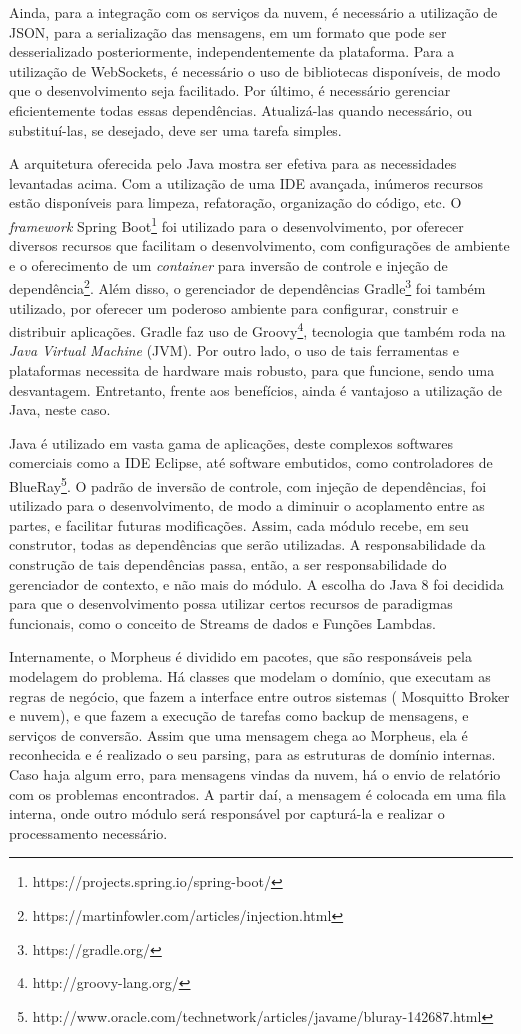 Ainda, para a integração com os serviços da nuvem, é necessário a utilização de JSON, para a serialização das mensagens, em um formato que pode ser desserializado posteriormente, independentemente da plataforma. Para a utilização de WebSockets, é necessário o uso de bibliotecas disponíveis, de modo que o desenvolvimento seja facilitado. Por último, é necessário gerenciar eficientemente todas essas dependências. Atualizá-las quando necessário, ou substituí-las, se desejado, deve ser uma tarefa simples.

A arquitetura oferecida pelo Java mostra ser efetiva para as necessidades levantadas acima. Com a utilização de uma IDE avançada, inúmeros recursos estão disponíveis para limpeza, refatoração, organização do código, etc. O \textit{framework} Spring Boot\footnote{https://projects.spring.io/spring-boot/} foi utilizado para o desenvolvimento, por oferecer diversos recursos que facilitam o desenvolvimento, com configurações de ambiente e o oferecimento de um \textit{container} para inversão de controle e injeção de dependência\footnote{https://martinfowler.com/articles/injection.html}. Além disso, o gerenciador de dependências Gradle\footnote{https://gradle.org/} foi também utilizado, por oferecer um poderoso ambiente para configurar, construir e distribuir aplicações. Gradle faz uso de Groovy\footnote{http://groovy-lang.org/}, tecnologia que também roda na \textit{Java Virtual Machine} (JVM). Por outro lado, o uso de tais ferramentas e plataformas necessita de hardware mais robusto, para que funcione, sendo uma desvantagem. Entretanto, frente aos benefícios, ainda é vantajoso a utilização de Java, neste caso.

Java é utilizado em vasta gama de aplicações, deste complexos softwares comerciais como a IDE Eclipse, até software embutidos, como controladores de BlueRay\footnote{http://www.oracle.com/technetwork/articles/javame/bluray-142687.html}.
O padrão de inversão de controle, com injeção de dependências, foi utilizado para o desenvolvimento, de modo a diminuir o acoplamento entre as partes, e facilitar futuras modificações. Assim, cada módulo recebe, em seu construtor, todas as dependências que serão utilizadas. A responsabilidade da construção de tais dependências passa, então, a ser responsabilidade do gerenciador de contexto, e não mais do módulo. A escolha do Java 8 foi decidida para que o desenvolvimento possa utilizar certos recursos de paradigmas funcionais, como o conceito de Streams de dados e Funções Lambdas.

Internamente, o Morpheus é dividido em pacotes, que são responsáveis pela modelagem do problema. Há classes que modelam o domínio, que executam as regras de negócio, que fazem a interface entre outros sistemas (\wmqtt{} Mosquitto Broker e nuvem), e que fazem a execução de tarefas como backup de mensagens, e serviços de conversão.
Assim que uma mensagem chega ao Morpheus, ela é reconhecida e é realizado o seu parsing, para as estruturas de domínio internas. Caso haja algum erro, para mensagens vindas da nuvem, há o envio de relatório com os problemas encontrados. A partir daí, a mensagem é colocada em uma fila interna, onde outro módulo será responsável por capturá-la e realizar o processamento necessário.


